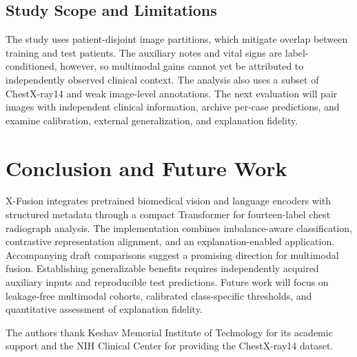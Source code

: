\documentclass[pdflatex,sn-mathphys-num]{sn-jnl}
\begin{document}
\subsection{Study Scope and Limitations}

The study uses patient-disjoint image partitions, which mitigate overlap between training and test patients. The auxiliary notes and vital signs are label-conditioned, however, so multimodal gains cannot yet be attributed to independently observed clinical context. The analysis also uses a subset of ChestX-ray14 and weak image-level annotations. The next evaluation will pair images with independent clinical information, archive per-case predictions, and examine calibration, external generalization, and explanation fidelity.

\section{Conclusion and Future Work}

X-Fusion integrates pretrained biomedical vision and language encoders with structured metadata through a compact Transformer for fourteen-label chest radiograph analysis. The implementation combines imbalance-aware classification, contrastive representation alignment, and an explanation-enabled application. Accompanying draft comparisons suggest a promising direction for multimodal fusion. Establishing generalizable benefits requires independently acquired auxiliary inputs and reproducible test predictions. Future work will focus on leakage-free multimodal cohorts, calibrated class-specific thresholds, and quantitative assessment of explanation fidelity.

\backmatter


The authors thank Keshav Memorial Institute of Technology for its academic support and the NIH Clinical Center for providing the ChestX-ray14 dataset.


\begingroup
\setlength{\bibsep}{0.65em}

\endgroup
\end{document}
